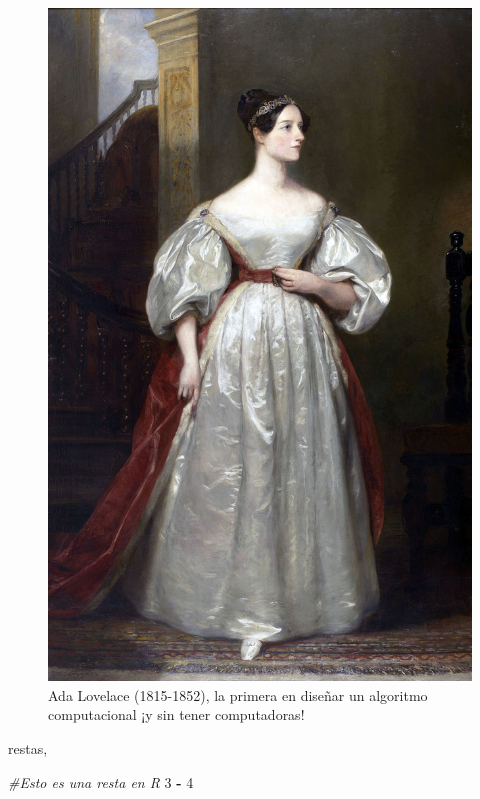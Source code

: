 \documentclass[
]{book}
\newenvironment{Shaded}{\begin{snugshade}}{\end{snugshade}}
\newcommand{\CommentTok}[1]{\textcolor[rgb]{0.56,0.35,0.01}{\textit{#1}}}
\newcommand{\DecValTok}[1]{\textcolor[rgb]{0.00,0.00,0.81}{#1}}
\newcommand{\OperatorTok}[1]{\textcolor[rgb]{0.81,0.36,0.00}{\textbf{#1}}}
\newcommand{\StringTok}[1]{\textcolor[rgb]{0.31,0.60,0.02}{#1}}
\begin{document}
\begin{figure}

{\centering \includegraphics[width=14.22in]{images/ada_lovelace} 

}

\caption{Ada Lovelace (1815-1852), la primera en diseñar un algoritmo computacional ¡y sin tener computadoras!}\label{fig:unnamed-chunk-39}
\end{figure}

restas,

\begin{Shaded}
\begin{Highlighting}[]
\CommentTok{#Esto es una resta en R}
\DecValTok{3} \OperatorTok{-}\StringTok{ }\DecValTok{4}
\end{Highlighting}
\end{Shaded}
\end{document}
